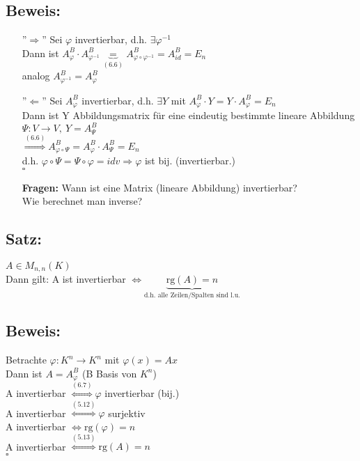 \subsection*{Beweis:}
\begin{enumerate}
	\item[''$\Rightarrow$'']
	Sei $\varphi$ invertierbar, d.h. $\exists \varphi^{-1}$\\
	Dann ist $A_{\varphi}^B\cdot A_{\varphi^{-1}}^B \underbrace{=}_{(6.6)} A_{\varphi\circ\varphi^{-1}}^B = A_{id}^B = E_n$\\
	analog $A_{\varphi^{-1}}^B=A_{\varphi}^B$
	
	\item[''$\Leftarrow$'']
	Sei $A_{\varphi}^B$ invertierbar, d.h. $\exists Y$ mit $A_{\varphi}^B\cdot Y=Y\cdot A_{\varphi}^B = E_n$\\
	Dann ist Y Abbildungsmatrix für eine eindeutig bestimmte lineare Abbildung $\Psi: V\rightarrow V,  \ Y=A_{\Psi}^B$\\
	$\stackrel{(6.6)}{\Rightarrow} A_{\varphi\circ\Psi}^B = A_{\varphi}^B\cdot A_{\Psi}^B = E_n$\\
	d.h. $\varphi\circ\Psi=\Psi\circ\varphi=idv \Rightarrow \varphi$ ist bij. (invertierbar.)\\
	\hspace*{13cm}$\square$
	
	\textbf{Fragen:} Wann ist eine Matrix (lineare Abbildung) invertierbar?\\
	Wie berechnet man inverse?
\end{enumerate}

\subsection{Satz:}
$A\in M_{n,n}(K)$\\
Dann gilt: A ist invertierbar $\Leftrightarrow \underbrace{\mathrm{rg}(A)=n}_{\text{d.h. alle Zeilen/Spalten sind l.u.}}$

\subsection*{Beweis:}
Betrachte $\varphi: K^n\rightarrow K^n$ mit $\varphi(x)=Ax$\\
Dann ist $A = A_{\varphi}^B$ (B Basis von $K^n$)\\
A invertierbar $\stackrel{(6.7)}{\Leftrightarrow} \varphi$ invertierbar (bij.)\\
A invertierbar $\stackrel{(5.12)}{\Leftrightarrow} \varphi$ surjektiv\\
A invertierbar $\Leftrightarrow \mathrm{rg}(\varphi)=n$\\
A invertierbar $\stackrel{(5.13)}{\Leftrightarrow} \mathrm{rg}(A)=n$\\
\hspace*{13cm}$\square$

